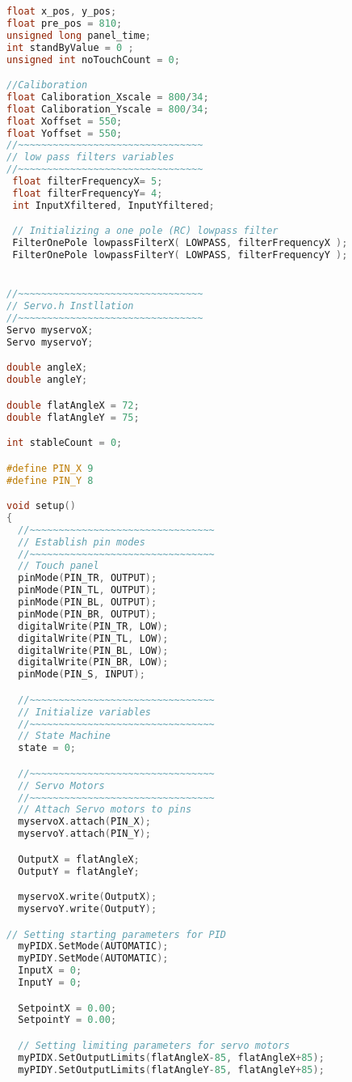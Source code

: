 \begin{lstlisting}[language=C++ , caption= Arduino  full code for controlling the system by internal PID]
float x_pos, y_pos;
float pre_pos = 810;
unsigned long panel_time;
int standByValue = 0 ;
unsigned int noTouchCount = 0;

//Caliboration
float Caliboration_Xscale = 800/34;
float Caliboration_Yscale = 800/34;
float Xoffset = 550;
float Yoffset = 550;
//~~~~~~~~~~~~~~~~~~~~~~~~~~~~~~~~
// low pass filters variables
//~~~~~~~~~~~~~~~~~~~~~~~~~~~~~~~~
 float filterFrequencyX= 5;
 float filterFrequencyY= 4;
 int InputXfiltered, InputYfiltered;

 // Initializing a one pole (RC) lowpass filter
 FilterOnePole lowpassFilterX( LOWPASS, filterFrequencyX );
 FilterOnePole lowpassFilterY( LOWPASS, filterFrequencyY );


//~~~~~~~~~~~~~~~~~~~~~~~~~~~~~~~~
// Servo.h Instllation 
//~~~~~~~~~~~~~~~~~~~~~~~~~~~~~~~~
Servo myservoX;
Servo myservoY;

double angleX;
double angleY;

double flatAngleX = 72;
double flatAngleY = 75;

int stableCount = 0;

#define PIN_X 9
#define PIN_Y 8

void setup()
{ 
  //~~~~~~~~~~~~~~~~~~~~~~~~~~~~~~~~
  // Establish pin modes
  //~~~~~~~~~~~~~~~~~~~~~~~~~~~~~~~~
  // Touch panel
  pinMode(PIN_TR, OUTPUT);
  pinMode(PIN_TL, OUTPUT);
  pinMode(PIN_BL, OUTPUT);
  pinMode(PIN_BR, OUTPUT);
  digitalWrite(PIN_TR, LOW);
  digitalWrite(PIN_TL, LOW);
  digitalWrite(PIN_BL, LOW);
  digitalWrite(PIN_BR, LOW);
  pinMode(PIN_S, INPUT);

  //~~~~~~~~~~~~~~~~~~~~~~~~~~~~~~~~
  // Initialize variables
  //~~~~~~~~~~~~~~~~~~~~~~~~~~~~~~~~
  // State Machine
  state = 0;

  //~~~~~~~~~~~~~~~~~~~~~~~~~~~~~~~~
  // Servo Motors
  //~~~~~~~~~~~~~~~~~~~~~~~~~~~~~~~~
  // Attach Servo motors to pins
  myservoX.attach(PIN_X);
  myservoY.attach(PIN_Y);

  OutputX = flatAngleX;
  OutputY = flatAngleY;

  myservoX.write(OutputX);
  myservoY.write(OutputY);

// Setting starting parameters for PID
  myPIDX.SetMode(AUTOMATIC);
  myPIDY.SetMode(AUTOMATIC);
  InputX = 0;
  InputY = 0;

  SetpointX = 0.00;
  SetpointY = 0.00;

  // Setting limiting parameters for servo motors
  myPIDX.SetOutputLimits(flatAngleX-85, flatAngleX+85);
  myPIDY.SetOutputLimits(flatAngleY-85, flatAngleY+85);


\end{lstlisting}
